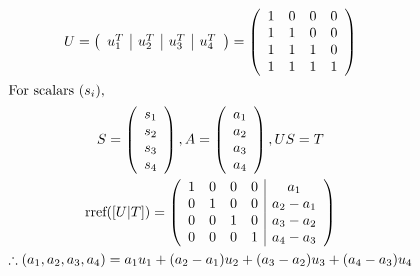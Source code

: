 \documentclass[12pt]{article}
\newenvironment{problem}[2][Problem]{\begin{trivlist}
\item[\hskip \labelsep {\bfseries #1}\hskip \labelsep {\bfseries #2.}]}{\end{trivlist}}
\begin{document}
\begin{problem}{9}
\end{problem}
\begin{gather*}
	U = 
	\left( \begin{array}{c|c|c|c}
		u_1^T & u_2^T & u_3^T & u_4^T\\
	\end{array} \right) 
	=
	\left( \begin{array}{cccc}
		1 & 0 & 0 & 0\\
		1 & 1 & 0 & 0\\
		1 & 1 & 1 & 0\\
		1 & 1 & 1 & 1\\
	\end{array} \right) \\
	\intertext{For scalars $(s_i)$,}
	S =
	\left( \begin{array}{c}
		s_1\\
		s_2\\
		s_3\\
		s_4\\
	\end{array} \right),
	A =
	\left( \begin{array}{c}
		a_1\\
		a_2\\
		a_3\\
		a_4\\
	\end{array} \right),
	US = T \\
	\text{rref}([U|T]) =
	\left( \begin{array}{cccc|c}
		1 & 0 & 0 & 0 & a_1\\
		0 & 1 & 0 & 0 & a_2-a_1\\
		0 & 0 & 1 & 0 & a_3-a_2\\
		0 & 0 & 0 & 1 & a_4-a_3\\
	\end{array} \right) \\
	\therefore (a_1,a_2,a_3,a_4) = a_1u_1 + (a_2-a_1)u_2 + (a_3-a_2)u_3 + (a_4-a_3)u_4 
\end{gather*}
\filbreak
\end{document}
